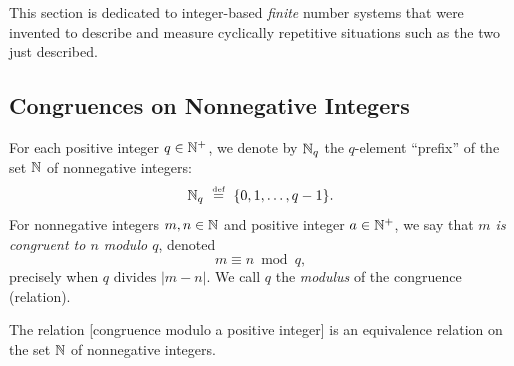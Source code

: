 This section is dedicated to integer-based {\em finite} number systems that were invented to describe and measure cyclically repetitive situations such as the two just described.

\subsection{Congruences on Nonnegative Integers}
\label{sec:congruences}

 
For each positive integer $q \in \mathbb{N}^+$, we denote by $\mathbb{N}_q$ the $q$-element ``prefix'' of the set $\mathbb{N}$ of nonnegative integers:
\[ \mathbb{N}_q \ \stackrel{\mbox{{\tiny def}}}{=} \ \{0, 1, \ldots, q-1\} . \]
For nonnegative integers $m, n \in \mathbb{N}$ and positive integer $a \in \mathbb{N}^+$, we say that {\em $m$ is congruent to $n$ modulo $q$}, denoted
\[ m \equiv n \bmod q, \]
precisely when $q \mbox{ divides } |m-n|$.  We call $q$ the {\it modulus} of the congruence (relation).

\begin{prop}
\label{thm:CONGisEQUIVALENCE-REL}
The relation [congruence modulo a positive integer] is an equivalence relation on the set $\mathbb{N}$ of nonnegative integers.
\end{prop}

